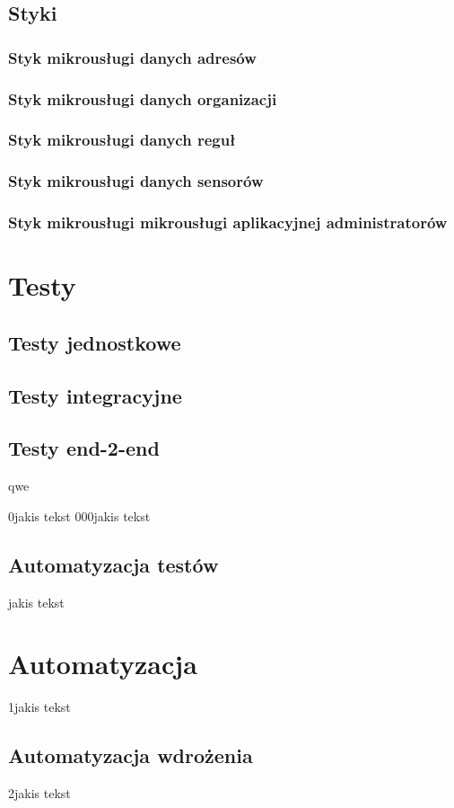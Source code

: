 \documentclass[11pt]{article} %
\begin{document}
\subsection{Styki}
\subsubsection{Styk mikrousługi danych adresów}
\subsubsection{Styk mikrousługi danych organizacji}
\subsubsection{Styk mikrousługi danych reguł}
\subsubsection{Styk mikrousługi danych sensorów}
\subsubsection{Styk mikrousługi mikrousługi aplikacyjnej administratorów}
\section{Testy}
\subsection{Testy jednostkowe}
\subsection{Testy integracyjne}
\subsection{Testy end-2-end}
qwe

0jakis tekst
000jakis tekst

\subsection{Automatyzacja testów}
jakis tekst
\section{Automatyzacja}
1jakis tekst
\subsection{Automatyzacja wdrożenia}
2jakis tekst
\end{document}
